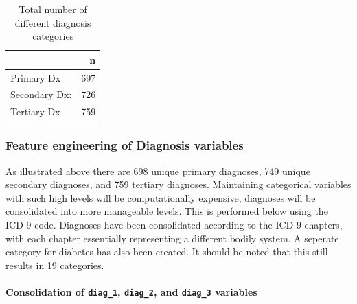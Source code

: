 \documentclass[
]{article}
\begin{document}
\begin{table}[H]

\caption{\label{tab:unnamed-chunk-18}Total number of different diagnosis categories}
\centering
\begin{tabular}[t]{l|r}
\hline
  & n\\
\hline
Primary Dx & 697\\
\hline
Secondary Dx: & 726\\
\hline
Tertiary Dx & 759\\
\hline
\end{tabular}
\end{table}

\hypertarget{feature-engineering-of-diagnosis-variables}{%
\subsubsection{Feature engineering of Diagnosis
variables}\label{feature-engineering-of-diagnosis-variables}}

As illustrated above there are 698 unique primary diagnoses, 749 unique
secondary diagnoses, and 759 tertiary diagnoses. Maintaining categorical
variables with such high levels will be computationally expensive,
diagnoses will be consolidated into more manageable levels. This is
performed below using the ICD-9 code. Diagnoses have been consolidated
according to the ICD-9 chapters, with each chapter essentially
representing a different bodily system. A seperate category for diabetes
has also been created. It should be noted that this still results in 19
categories.

\hypertarget{consolidation-of-diag_1-diag_2-and-diag_3-variables}{%
\paragraph{\texorpdfstring{Consolidation of \texttt{diag\_1},
\texttt{diag\_2}, and \texttt{diag\_3}
variables}{Consolidation of diag\_1, diag\_2, and diag\_3 variables}}\label{consolidation-of-diag_1-diag_2-and-diag_3-variables}}
\end{document}
